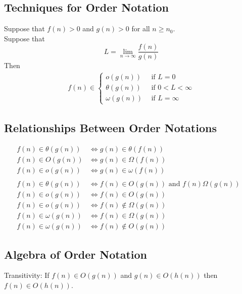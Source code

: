 \documentclass[12pt]{article}
\theoremstyle{definition}
\begin{document}
\subsection{Techniques for Order Notation}
Suppose that $f(n) > 0$ and $g(n) > 0$ for all $n \geq n_{0}$. \\
Suppose that
$$L = \lim_{n\to\infty}\frac{f(n)}{g(n)}$$
Then
\begin{align*}
  f(n) \in
  \begin{cases}
    o(g(n)) ~~&\text{if } L = 0 \\
    \theta(g(n)) ~~& \text{if } 0 < L < \infty \\
    \omega(g(n)) ~~&\text{if } L = \infty
  \end{cases}
\end{align*}

\subsection{Relationships Between Order Notations}
\begin{align*}
  f(n) \in \theta(g(n)) &\Longleftrightarrow g(n) \in \theta(f(n))& \\
  f(n) \in O(g(n)) &\Longleftrightarrow g(n) \in \Omega(f(n))& \\
  f(n) \in o(g(n)) &\Longleftrightarrow g(n) \in \omega(f(n))& \\ \\
  f(n) \in \theta(g(n)) &\Longleftrightarrow
    f(n) \in O(g(n)) \text{ and } f(n) \Omega(g(n))& \\
  f(n) \in o(g(n)) &\Longleftrightarrow f(n) \in O(g(n)) \\
  f(n) \in o(g(n)) &\Longleftrightarrow f(n) \not\in \Omega(g(n)) \\
  f(n) \in \omega(g(n)) &\Longleftrightarrow f(n) \in \Omega(g(n)) \\
  f(n) \in \omega(g(n)) &\Longleftrightarrow f(n) \not\in O(g(n))
\end{align*}

\subsection{Algebra of Order Notation}
Transitivity: If $f(n) \in O(g(n))$ and $g(n) \in O(h(n))$ then $f(n) \in O(h(n))$. \\
\end{document}
